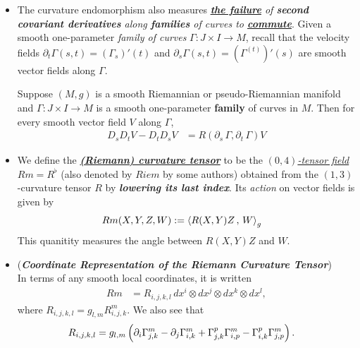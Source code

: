 \documentclass[11pt]{article}
\begin{document}
\begin{itemize}
\item \begin{remark}
The curvature endomorphism also measures \emph{\underline{\textbf{the failure}} of \textbf{second covariant derivatives} along \textbf{families} of curves to \underline{\textbf{commute}}}. Given a smooth one-parameter \emph{family of curves} $\Gamma: J \times I \rightarrow M$, recall that the velocity fields $\partial_{t}\Gamma(s,t) = (\Gamma_s)'(t)$ and $\partial_{s}\Gamma(s,t) = (\Gamma^{(t)})'(s)$ are smooth vector fields along $\Gamma$.

\begin{proposition}
Suppose $(M,g)$  is a smooth Riemannian or pseudo-Riemannian manifold and  $\Gamma: J \times I \rightarrow M$  is a smooth one-parameter \textbf{family} of curves in $M$.
Then for every smooth vector field $V$ along $\Gamma$,
\begin{align}
D_{s}D_{t}V - D_{t}D_{s}V &= R(\partial_s\,\Gamma, \partial_t\,\Gamma)V  \label{eqn: rieman_curvature_2nd_covariant_deriv_not_commute}
\end{align}
\end{proposition}
\end{remark}

\item \begin{definition}
We define the \underline{\emph{\textbf{(Riemann) curvature tensor}}} to be the \underline{\emph{$(0,4)$-tensor field}} $Rm = R^{\flat}$ (also denoted by
$Riem$ by some authors) obtained from the $(1,3)$-curvature tensor $R$ by \emph{\textbf{lowering its last index}}. Its \emph{action} on vector fields is given by
\begin{align}
Rm(X, Y, Z, W) &:= \left\langle R(X, Y)Z\,,\, W \right\rangle_{g} \label{eqn: rieman_curvature_tensor_on_vector_field}
\end{align} This quanitity measures the angle between $R(X, Y)Z$ and $W$.
\end{definition}

\item \begin{remark} (\emph{\textbf{Coordinate Representation of the Riemann Curvature Tensor}})\\
In terms of any smooth local coordinates, it is written
\begin{align*}
Rm &= R_{i,j,k,l}\,dx^i \otimes dx^j \otimes dx^k \otimes dx^l,
\end{align*}
where $ R_{i,j,k,l} = g_{l,m}R_{i,j,k}^{m}$.  We also see that 
\begin{align}
R_{i,j,k,l} &= g_{l,m}\left(\partial_i \Gamma_{j,k}^{m} -\partial_j \Gamma_{i,k}^{m} + \Gamma_{j,k}^{p}\Gamma_{i,p}^{m}- \Gamma_{i,k}^{p}\Gamma_{j,p}^{m}\right). \label{eqn: rieman_curvature_tensor_coefficient}
\end{align}
\end{remark}


\end{itemize}
\end{document}
